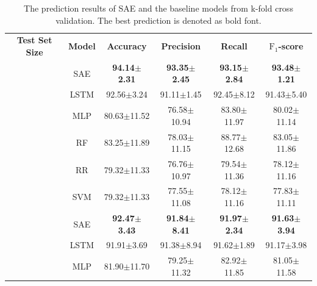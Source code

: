 \begin{table}[h]\label{tab: experimetal results}
    \small
    \setlength{\tabcolsep}{4pt} %
    \centering
    \caption{The prediction results of SAE and the baseline models from k-fold cross validation. The best prediction is denoted as bold font.}\label{tab: prediction RMSE}
    \begin{tabular}{|c|c|c|c|c|c|} %
    \hline
    {\bfseries Test Set Size} & {\bfseries Model} & \multicolumn{1}{c}{{\bfseries Accuracy}} & \multicolumn{1}{c}{{\bfseries Precision}} & \multicolumn{1}{c}{{\bfseries Recall}} & {\bfseries $\text{F}_1$-score}\\ %
    \Xhline{1pt}
    \multirow{6}{*}{20\%} %
    & SAE & \multicolumn{1}{c}{{\bfseries 94.14$\pm$2.31}} & \multicolumn{1}{c}{\bfseries{93.35$\pm$2.45}} & \multicolumn{1}{c}{{\bfseries 93.15$\pm$2.84}} & {\bfseries 93.48$\pm$1.21}\\
    & LSTM & \multicolumn{1}{c}{92.56$\pm$3.24} & \multicolumn{1}{c}{91.11$\pm$1.45} & \multicolumn{1}{c}{92.45$\pm$8.12} & 91.43$\pm$5.40\\
    & MLP & \multicolumn{1}{c}{80.63$\pm$11.52} & \multicolumn{1}{c}{76.58$\pm$10.94} & \multicolumn{1}{c}{83.80$\pm$11.97} & 80.02$\pm$11.14\\
    & RF & \multicolumn{1}{c}{83.25$\pm$11.89} & \multicolumn{1}{c}{78.03$\pm$11.15} & \multicolumn{1}{c}{88.77$\pm$12.68} & 83.05$\pm$11.86\\
    & RR & \multicolumn{1}{c}{79.32$\pm$11.33} & \multicolumn{1}{c}{76.76$\pm$10.97} & \multicolumn{1}{c}{79.54$\pm$11.36} & 78.12$\pm$11.16\\
    & SVM & \multicolumn{1}{c}{79.32$\pm$11.33} & \multicolumn{1}{c}{77.55$\pm$11.08} & \multicolumn{1}{c}{78.12$\pm$11.16} & 77.83$\pm$11.11\\
    \Xhline{1pt}
    \multirow{6}{*}{25\%} %
    & SAE & \multicolumn{1}{c}{{\bfseries 92.47$\pm$3.43}} & \multicolumn{1}{c}{{\bfseries 91.84$\pm$8.41}} & \multicolumn{1}{c}{{\bfseries 91.97$\pm$2.34}} & {\bfseries 91.63$\pm$3.94}\\
    & LSTM & \multicolumn{1}{c}{91.91$\pm$3.69} & \multicolumn{1}{c}{91.38$\pm$8.94} & \multicolumn{1}{c}{91.62$\pm$1.89} & 91.17$\pm$3.98\\
    & MLP & \multicolumn{1}{c}{81.90$\pm$11.70} & \multicolumn{1}{c}{79.25$\pm$11.32} & \multicolumn{1}{c}{82.92$\pm$11.85} & 81.05$\pm$11.58\\

\end{tabular}
\end{table}
